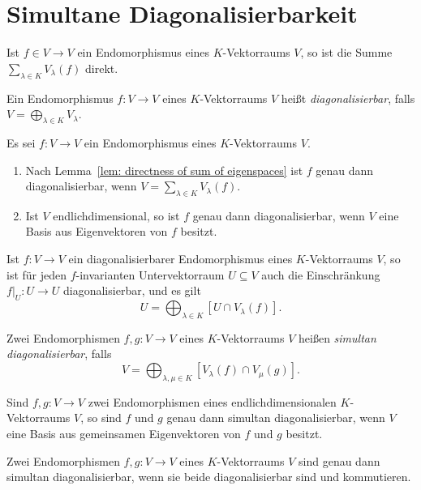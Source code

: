 \section{Simultane Diagonalisierbarkeit}


\begin{lemma}\label{lem: directness of sum of eigenspaces}
  Ist $f \in V \to V$ ein Endomorphismus eines $K$-Vektorraums $V$, so ist die Summe $\sum_{\lambda \in K} V_\lambda(f)$ direkt.
\end{lemma}


\begin{definition}
  Ein Endomorphismus $f \colon V \to V$ eines $K$-Vektorraums $V$ heißt \emph{diagonalisierbar}, falls $V = \bigoplus_{\lambda \in K} V_\lambda$.
\end{definition}


\begin{remark}
  Es sei $f \colon V \to V$ ein Endomorphismus eines $K$-Vektorraums $V$.
  \begin{enumerate}[leftmargin=*, label=\roman*)]
    \item
      Nach Lemma~\ref{lem: directness of sum of eigenspaces} ist $f$ genau dann diagonalisierbar, wenn $V = \sum_{\lambda \in K} V_\lambda(f)$.
    \item
      Ist $V$ endlichdimensional, so ist $f$ genau dann diagonalisierbar, wenn $V$ eine Basis aus Eigenvektoren von $f$ besitzt.
  \end{enumerate}
\end{remark}


\begin{proposition}
  Ist $f \colon V \to V$ ein diagonalisierbarer Endomorphismus eines $K$-Vek\-tor\-raums $V$, so ist für jeden $f$-invarianten Untervektorraum $U \subseteq V$ auch die Einschränkung $f|_U \colon U \to U$ diagonalisierbar, und es gilt
  \[
    U = \bigoplus_{\lambda \in K} [ U \cap V_\lambda(f) ].
  \]
\end{proposition}


\begin{definition}
  Zwei Endomorphismen $f, g \colon V \to V$ eines $K$-Vektorraums $V$ heißen \emph{simultan diagonalisierbar}, falls
  \[
    V = \bigoplus_{\lambda, \mu \in K} [V_\lambda(f) \cap V_\mu(g)].
  \]
\end{definition}


\begin{remark}
  Sind $f, g \colon V \to V$ zwei Endomorphismen eines endlichdimensionalen $K$-Vektorraums $V$, so sind $f$ und $g$ genau dann simultan diagonalisierbar, wenn $V$ eine Basis aus gemeinsamen Eigenvektoren von $f$ und $g$ besitzt.
\end{remark}


\begin{proposition}
  Zwei Endomorphismen $f, g \colon V \to V$ eines $K$-Vektorraums $V$ sind genau dann simultan diagonalisierbar, wenn sie beide diagonalisierbar sind und kommutieren.
\end{proposition}






